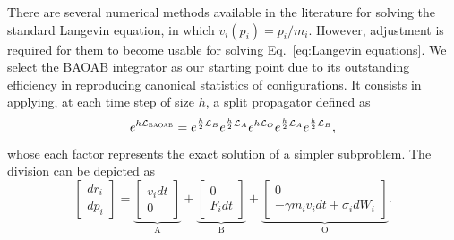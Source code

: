 \documentclass[
aip,
jcp,
reprint,
]{revtex4-1}
\newcommand{\timestep}{h}
\begin{document}
There are several numerical methods available in the literature for solving the standard Langevin equation, in which $v_i(p_i) = p_i/m_i$.
However, adjustment is required for them to become usable for solving Eq.~\eqref{eq:Langevin equations}.
We select the BAOAB integrator \cite{Leimkuhler_2012, Leimkuhler_2013_2} as our starting point due to its outstanding efficiency in reproducing canonical statistics of configurations.
It consists in applying, at each time step of size $\timestep$, a split propagator defined as
\begin{equation}
e^{\timestep \mathcal{L}_\textsc{BAOAB}} =
e^{\frac{\timestep}{2} \mathcal{L}_B}
e^{\frac{\timestep}{2} \mathcal{L}_A}
e^{\timestep \mathcal{L}_O}
e^{\frac{\timestep}{2} \mathcal{L}_A}
e^{\frac{\timestep}{2} \mathcal{L}_B},
\end{equation}
whose each factor represents the exact solution of a simpler subproblem.
The division can be depicted \cite{Leimkuhler_2015} as
\begin{equation}
\left[\begin{array}{c}
dr_i \\ dp_i
\end{array}\right] =
\underbrace{\left[\begin{array}{c}
v_i dt \\ 0
\end{array}\right]}_\mathrm{A} + 
\underbrace{\left[\begin{array}{c}
0 \\ F_i dt
\end{array}\right]}_\mathrm{B} +
\underbrace{\left[\begin{array}{c}
0 \\ -\gamma m_i v_i dt + \sigma_i dW_i
\end{array}\right]}_\mathrm{O}.
\end{equation}
\end{document}
